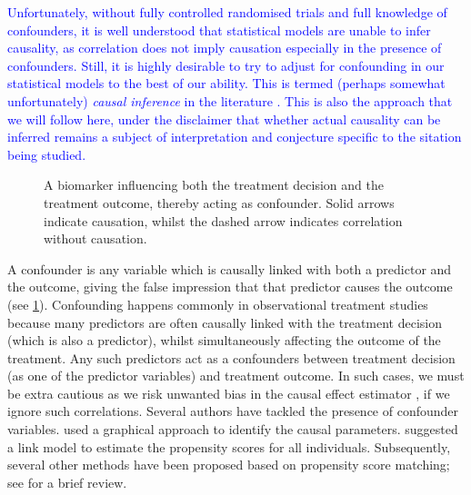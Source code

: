 \documentclass[preprint,12pt]{elsarticle}
\newcommand{\added}[1]{\textcolor{blue}{#1}}
\begin{document}
\added{%
Unfortunately, without fully controlled randomised trials and full
knowledge of confounders, it is well understood that
statistical models are unable to infer causality, as correlation
does not imply causation especially in the presence of confounders.
Still, it is highly desirable to try to adjust for confounding in
our statistical models to the best of our ability. This is termed
(perhaps somewhat unfortunately) \emph{causal inference} in the
literature
\citep{rubin1978,rosenbaum83,Robins1986ANA,winship99,stuart10,Zigler2014,wang2015,koch2018,Hahn2018,koch2020}.
This is also the approach that we will follow here, under the
disclaimer that whether actual causality can be inferred
remains a subject of interpretation and conjecture specific to the
sitation being studied.%
}

\begin{figure}
\begin{center}
\end{center}
\caption{A biomarker influencing both the treatment decision and the treatment outcome, thereby acting as confounder. Solid arrows indicate causation, whilst the dashed arrow indicates correlation without causation.}
\label{fig:confounding}
\end{figure}
A confounder is any variable which is causally linked with both a predictor and the outcome, giving the false impression that that predictor causes the outcome (see \cref{fig:confounding}).
Confounding happens commonly in observational treatment studies because many predictors are often causally linked with the treatment decision (which is also a predictor), whilst simultaneously affecting the outcome of the treatment. Any such predictors act as a confounders between treatment decision (as one of the predictor variables) and treatment outcome.
In such cases, we must be extra cautious as we risk
unwanted bias in the causal effect estimator \citep{rosenbaum83},
if we ignore such correlations.
Several authors have tackled the presence of
confounder variables. 
 used a graphical
approach to identify the causal parameters.
 suggested a link model to estimate
the propensity scores for all individuals. Subsequently, several other
methods have been proposed based on propensity score matching;
see \citep{winship99,stuart10} for a brief review.
\end{document}
